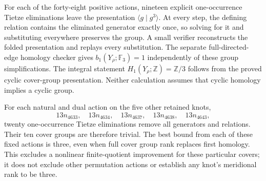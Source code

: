 \documentclass[11pt]{article}
\newcommand{\F}{\mathbb F}
\begin{document}
For each of the forty-eight positive actions, nineteen explicit
one-occurrence Tietze eliminations leave the presentation
$\langle g\mid g^3\rangle$. At every step, the defining relation
contains the eliminated generator exactly once, so solving for it
and substituting everywhere preserves the group. A small verifier
reconstructs the folded presentation and replays every substitution.
The separate full-directed-edge homology checker gives
$b_1(Y_\rho;\F_3)=1$ independently of these group
simplifications. The integral statement $H_1(Y_\rho;\mathbb Z)=\mathbb Z/3$
follows from the proved cyclic cover-group presentation. Neither calculation assumes that cyclic homology
implies a cyclic group.

For each natural and dual action on the five other retained knots,
\[
             13n_{4633},\quad13n_{4634},\quad13n_{4637},\quad
             13n_{4638},\quad13n_{4643},
\]
twenty one-occurrence Tietze eliminations remove all generators and
relations. Their ten cover groups are therefore trivial. The best
bound from each of these fixed actions is three, even when full cover
group rank replaces first homology. This excludes a nonlinear
finite-quotient improvement for these particular covers; it does not
exclude other permutation actions or establish any knot's meridional
rank to be three.
\end{document}

